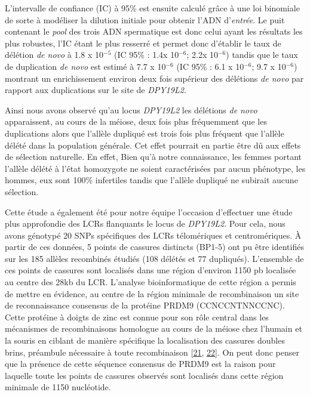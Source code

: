 \documentclass[12pt,twoside]{ugathesis}
\begin{document}
L'intervalle de confiance (IC) à 95\% est ensuite calculé grâce à une
loi binomiale de sorte à modéliser la dilution initiale pour obtenir
l'ADN d'\emph{entrée}. Le puit contenant le \emph{pool} des trois ADN
spermatique est donc celui ayant les résultats les plus robustes, l'IC
étant le plus resserré et permet donc d'établir le taux de délétion
\emph{de novo} à 1.8 x 10\(^{-5}\) (IC 95\% : 1.4x 10\(^{-6}\); 2.2x
10\(^{-6}\)) tandis que le taux de duplication \emph{de novo} est estimé
à 7.7 x 10\(^{-6}\) (IC 95\% : 6.1 x 10\(^{-6}\); 9.7 x 10\(^{-6}\))
montrant un enrichissement environ deux fois supérieur des délétions
\emph{de novo} par rapport aux duplications sur le site de
\emph{DPY19L2}.

Ainsi nous avons observé qu'au locus \emph{DPY19L2} les délétions
\emph{de novo} apparaissent, au cours de la méiose, deux fois plus
fréquemment que les duplications alors que l'allèle dupliqué est trois
fois plus fréquent que l'allèle délété dans la population générale. Cet
effet pourrait en partie être dû aux effets de sélection naturelle. En
effet, Bien qu'à notre connaissance, les femmes portant l'allèle délété
à l'état homozygote ne soient caractérisées par aucun phénotype, les
hommes, eux sont 100\% infertiles tandis que l'allèle dupliqué ne
subirait aucune sélection.

Cette étude a également été pour notre équipe l'occasion d'effectuer une
étude plus approfondie des LCRs flanquants le locus de \emph{DPY19L2}.
Pour cela, nous avons génotypé 20 SNPs spécifiques des LCRs télomériques
et centromériques. À partir de ces données, 5 points de cassures
distincts (BP1-5) ont pu être identifiés sur les 185 allèles recombinés
étudiés (108 délétés et 77 dupliqués). L'ensemble de ces points de
cassures sont localisés dans une région d'environ 1150 pb localisée au
centre des 28kb du LCR. L'analyse bioinformatique de cette région a
permis de mettre en évidence, au centre de la région minimale de
recombinaison un site de reconnaissance consensus de la protéine PRDM9
(CCNCCNTNNCCNC). Cette protéine à doigts de zinc est connue pour son
rôle central dans les mécanismes de recombinaisons homologue au cours de
la méiose chez l'humain et la souris en ciblant de manière spécifique la
localisation des cassures doubles brins, préambule nécessaire à toute
recombinaison {[}\protect\hyperlink{ref-Parvanov2010}{21},
\protect\hyperlink{ref-Baudat2010}{22}{]}. On peut donc penser que la
présence de cette séquence consensus de PRDM9 est la raison pour
laquelle toute les points de cassures observés sont localisés dans cette
région minimale de 1150 nucléotide.
\end{document}
